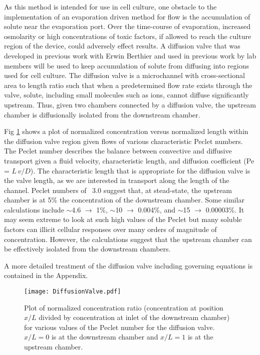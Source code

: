 As this method is intended for use in cell culture, one obstacle to the implementation of an evaporation driven method for flow is the accumulation of solute near the evaporation port. Over the time-course of evaporation, increased osmolarity or high concentrations of toxic factors, if allowed to reach the culture region of the device, could adversely effect results. A diffusion valve that was developed in previous work with Erwin Berthier and used in previous work by lab members \cite{Frisk:2008pi} will be used to keep accumulation of solute from diffusing into regions used for cell culture. The diffusion valve is a microchannel with cross-sectional area to length ratio such that when a predetermined flow rate exists through the valve, solute, including small molecules such as ions, cannot diffuse significantly upstream. Thus, given two chambers connected by a diffusion valve, the upstream chamber is diffusionally isolated from the downstream chamber. 

Fig \ref{fig:pecletFlow} shows a plot of normalized concentration versus normalized length within the diffusion valve region given flows of various characteristic Peclet numbers. The Peclet number describes the balance between convective and diffusive transport given a fluid velocity, characteristic length, and diffusion coefficient (Pe = $L\,v/D$). The characteristic length that is appropriate for the diffusion valve is the valve length, as we are interested in transport along the length of the channel. Peclet numbers of ~3.0 suggest that, at stead-state, the upstream chamber is at 5\% the concentration of the downstream chamber. Some similar calculations include $\sim$4.6 $\rightarrow$ 1\%, $\sim$10 $\rightarrow$ 0.004\%, and $\sim$15 $\rightarrow$ 0.00003\%. It may seem extreme to look at such high values of the Peclet but many soluble factors can illicit cellular responses over many orders of magnitude of concentration. However, the calculations suggest that the upstream chamber can be effectively isolated from the downstream chambers.

A more detailed treatment of the diffusion valve including governing equations is contained in the Appendix.

\begin{figure}[!ht]
\centering
\texttt{[image: DiffusionValve.pdf]}
\caption{Plot of normalized concentration ratio (concentration at position $x/L$ divided by concentration at inlet of the downstream chamber) for various values of the Peclet number for the diffusion valve. $x/L=0$ is at the downstream chamber and $x/L=1$ is at the upstream chamber.}
\label{fig:pecletFlow}
\end{figure}

